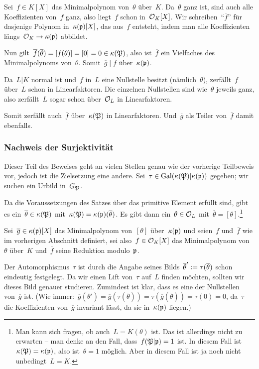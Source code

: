 \documentclass[8pt]{uebblatt}
\newcommand{\ov}[1]{\overline{#1}}
\begin{document}
Sei~$f \in K[X]$ das Minimalpolynom von~$\theta$ über~$K$. Da~$\theta$ ganz
ist, sind auch alle Koeffizienten von~$f$ ganz, also liegt~$f$ schon
in~$\mathcal{O}_K[X]$. Wir schreiben~"`$\ov f$"' für dasjenige Polynom
in~$\kappa(\mathfrak{p})[X]$, das aus~$f$ entsteht, indem man alle Koeffizienten
längs~$\mathcal{O}_K \to \kappa(\mathfrak{p})$ abbildet.

Nun gilt~$\ov f(\ov\theta) = [f(\theta)] = [0] = 0 \in \kappa(\PPP)$, also
ist~$\ov f$ ein Vielfaches des Minimalpolynoms von~$\ov\theta$. Somit~$\ov g
\mid \ov f$ über~$\kappa(\mathfrak{p})$.

Da~$L|K$ normal ist und~$f$ in~$L$ eine Nullstelle besitzt (nämlich~$\theta$),
zerfällt~$f$ über~$L$ schon in Linearfaktoren. Die einzelnen Nullstellen sind
wie~$\theta$ jeweils ganz, also zerfällt~$L$ sogar schon über~$\mathcal{O}_L$ in
Linearfaktoren.

Somit zerfällt auch~$\ov f$ über~$\kappa(\mathfrak{P})$ in Linearfaktoren. Und~$\ov g$
als Teiler von~$\ov f$ damit ebenfalls.


\subsubsection*{Nachweis der Surjektivität}

Dieser Teil des Beweises geht an vielen Stellen genau wie der vorherige
Teilbeweis vor, jedoch ist die Zielsetzung eine andere. Sei~$\tau \in
\mathrm{Gal}(\kappa(\mathfrak{P})|\kappa(\mathfrak{p}))$ gegeben; wir suchen ein Urbild
in~$G_{\mathfrak{P}}$.

Da die Voraussetzungen des Satzes über das primitive Element erfüllt sind, gibt
es ein~$\ov\theta \in \kappa(\PPP)$ mit~$\kappa(\PPP) = \kappa(\ppp)(\ov\theta)$.
Es gibt dann ein~$\theta \in \mathcal{O}_L$ mit~$\ov\theta = [\theta]$.\footnote{Man
kann sich fragen, ob auch~$L = K(\theta)$ ist. Das ist allerdings nicht zu
erwarten -- man denke an den Fall, dass~$f(\mathfrak{P}|\mathfrak{p}) = 1$ ist. In diesem Fall
ist~$\kappa(\mathfrak{P}) = \kappa(\mathfrak{p})$, also ist~$\theta = 1$ möglich. Aber in
diesem Fall ist ja noch nicht unbedingt~$L = K$.}

Sei~$\ov g \in \kappa(\ppp)[X]$ das Minimalpolynom von~$[\theta]$
über~$\kappa(\mathfrak{p})$ und seien~$f$ und~$\ov f$ wie im vorherigen Abschnitt
definiert, sei also~$f \in \mathcal{O}_K[X]$ das Minimalpolynom von~$\theta$ über~$K$
und~$\ov f$ seine Reduktion modulo~$\mathfrak{p}$.

Der Automorphismus~$\tau$ ist durch die Angabe seines Bilds~$\ov\theta' \defeq
\tau(\ov\theta)$ schon eindeutig festgelegt. Da wir einen Lift von~$\tau$
auf~$L$ finden möchten, sollten wir dieses Bild genauer studieren. Zumindest
ist klar, dass es eine der Nullstellen von~$\ov g$ ist. (Wie immer:~$\ov
g(\ov\theta') = \ov g(\tau(\ov\theta)) = \tau(\ov g(\ov\theta)) = \tau(0) =
0$, da~$\tau$ die Koeffizienten von~$\ov g$ invariant lässt, da sie
in~$\kappa(\mathfrak{p})$ liegen.)
\end{document}
